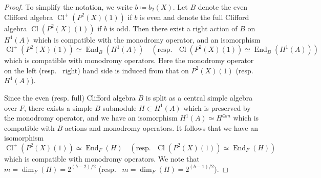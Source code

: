 \documentclass[12pt,reqno]{amsart}
\theoremstyle{definition}
\newcommand\End{\mathop{\mathrm{End}}\nolimits}
\newcommand\Cl{\mathop{\mathrm{Cl}}\nolimits}
\numberwithin{equation}{section}
\begin{document}
\begin{proof}
To simplify the notation, we write $b\coloneqq b_2(X)$.
Let
$B$ denote the
even Clifford algebra
$\Cl^+(P^2(X)(1))$
if $b$ is even
and denote the
full Clifford algebra
$\Cl(P^2(X)(1))$
if $b$ is odd.
Then
there exist a right action of
$B$
on $H^1(A)$
which is compatible with the monodromy operator,
and an isomorphism
\[
\Cl^+(P^2(X)(1)) \simeq \End_{B} (H^1(A))
\quad (\text{resp.~ } \Cl(P^2(X)(1)) \simeq \End_{B} (H^1(A)))
\]
which is compatible with monodromy operators.
Here the monodromy operator on the left (resp.~ right) hand side is induced from that on $P^2(X)(1)$ (resp.~ $H^1(A)$).


Since the even (resp. full) Clifford algebra
$B$
is split as a central simple algebra over $F$,
there exists
a simple $B$-submodule
$H \subset H^1(A)$
which is preserved by the monodromy operator, and we have
an isomorphism
$
H^1(A) \simeq H^{\oplus m}
$
which is compatible with $B$-actions and monodromy operators.
It follows that
we have an isomorphism
\begin{equation}\label{eq:Morita equivalence with monodromy}
   \Cl^+(P^2(X)(1)) \simeq \End_{F} (H)
\quad (\text{resp.~ } \Cl(P^2(X)(1)) \simeq \End_{F} (H))
\end{equation}
which is compatible with monodromy operators.
We note that
$m=\dim_F(H)=2^{(b-2)/2}$ (resp.~ $m=\dim_F(H)=2^{(b-1)/2}$).



\end{proof}
\end{document}
